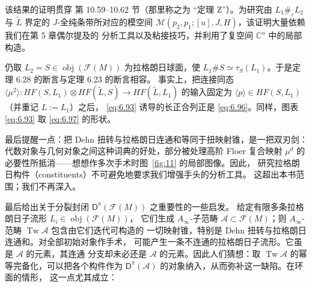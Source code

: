 
该结果的证明贯穿 \cite{FOOO07} 第 10.59--10.62 节（那里称之为
“定理 Z”）。为研究由 $L_1\#_\varepsilon L_2$ 与 $\tilde L$ 界定的
$J$-全纯条带所对应的模空间
$\mathcal M(p_2,p_1;[u],J,H)$，该证明大量依赖我们在第 5 章偶尔提及的
分析工具以及粘接技巧，并利用了复空间 $\mathbb C^n$ 中的局部构造。

\begin{Rem}\label{rem:6.29}
仍取 $L_2=S\in\operatorname{obj}(\mathcal F(M))$ 为拉格朗日球面，使
$L_1\#S\simeq\tau_S(L_1)$。于是定理 6.28 的断言与定理 6.23 的断言相容。
事实上，把连接同态
$\langle\mu^2\rangle:HF(S,L_1)\otimes HF(\tilde L,S)\to HF(\tilde L,L_1)$
的输入固定为 $\langle p\rangle\in HF(S,L_1)$（并重记 $L:=L_1$）之后，
\eqref{eq:6.93} 诱导的长正合列正是 \eqref{eq:6.96}。同样，图表
\eqref{eq:6.93} 取 \eqref{eq:6.97} 的形状。
\end{Rem}

最后提醒一点：把 Dehn 扭转与拉格朗日连通和等同于扭映射锥，是一把双刃剑：
代数对象与几何对象之间这种词典的好处，部分被处理高阶 Floer 复合映射
$\mu^d$ 的必要性所抵消——想想作多次手术时图~\ref{fig:11} 的局部图像。因此，
研究拉格朗日构件（constituents）不可避免地要求我们增强手头的分析工具。
这超出本书范围；我们不再深入。

最后给出关于分裂封闭 $\mathsf D^\pi(\mathcal F(M))$ 之重要性的一些启发。
给定有限多条拉格朗日子流形 $L_i\in\operatorname{obj}(\mathcal F(M))$，
它们生成 $A_\infty$-子范畴 $\mathcal A\subset\mathcal F(M)$；则
$A_\infty$-范畴 $\operatorname{Tw}\mathcal A$ 包含由它们迭代可构造的
一切映射锥，特别是 Dehn 扭转与拉格朗日连通和。对全部初始对象作手术，
可能产生一条不连通的拉格朗日子流形。它虽是 $\mathcal A$ 的元素，其连通
分支却未必还是 $\mathcal A$ 的元素。因此人们猜想：取
$\operatorname{Tw}\mathcal A$ 的幂等完备化，可以把各个构件作为
$\mathsf D^\pi(\mathcal A)$ 的对象纳入，从而弥补这一缺陷。在环面的情形，
这一点尤其成立：

